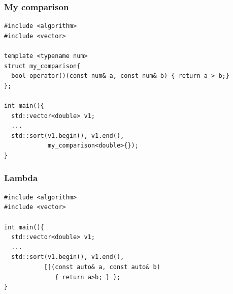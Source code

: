 \begin{frame}[fragile]
  \frametitle{My comparison}
\begin{lstlisting}
#include <algorithm>
#include <vector>
  
template <typename num>
struct my_comparison{
  bool operator()(const num& a, const num& b) { return a > b;}
};
  
int main(){
  std::vector<double> v1;
  ...
  std::sort(v1.begin(), v1.end(),
            my_comparison<double>{});
}
\end{lstlisting}
\end{frame}

\begin{frame}[fragile]
  \frametitle{Lambda}
\begin{lstlisting}
#include <algorithm>
#include <vector>

int main(){
  std::vector<double> v1;
  ...
  std::sort(v1.begin(), v1.end(),
           [](const auto& a, const auto& b)
              { return a>b; } );
}
\end{lstlisting}
\end{frame}
